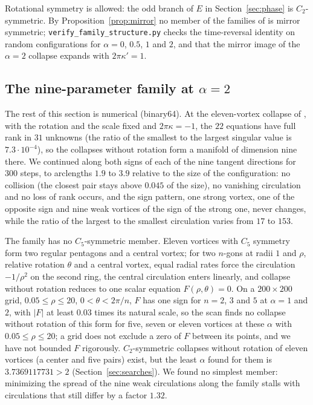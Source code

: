 \documentclass[11pt]{article}
\theoremstyle{definition}
\begin{document}
Rotational symmetry is allowed: the odd branch of $E$ in Section~\ref{sec:phase} is $C_2$-symmetric. By Proposition~\ref{prop:mirror} no member of the families of \cite[Theorem~5]{mw2026} is mirror symmetric; \texttt{verify\_\allowbreak family\_\allowbreak structure.py} checks the time-reversal identity on random configurations for $\alpha = 0$, $0.5$, $1$ and $2$, and that the mirror image of the $\alpha = 2$ collapse expands with $2\pi\kappa' = 1$.

\subsection{The nine-parameter family at \texorpdfstring{$\alpha = 2$}{alpha = 2}}\label{sec:family}

The rest of this section is numerical (binary64). At the eleven-vortex collapse of \cite[Theorem~5(a)]{mw2026}, with the rotation and the scale fixed and $2\pi\kappa = -1$, the $22$ equations have full rank in $31$ unknowns (the ratio of the smallest to the largest singular value is $7.3 \cdot 10^{-4}$), so the collapses without rotation form a manifold of dimension nine there. We continued along both signs of each of the nine tangent directions for $300$ steps, to arclengths $1.9$ to $3.9$ relative to the size of the configuration: no collision (the closest pair stays above $0.045$ of the size), no vanishing circulation and no loss of rank occurs, and the sign pattern, one strong vortex, one of the opposite sign and nine weak vortices of the sign of the strong one, never changes, while the ratio of the largest to the smallest circulation varies from $17$ to $153$.

The family has no $C_5$-symmetric member. Eleven vortices with $C_5$ symmetry form two regular pentagons and a central vortex; for two $n$-gons at radii $1$ and $\rho$, relative rotation $\theta$ and a central vortex, equal radial rates force the circulation $-1/\rho^2$ on the second ring, the central circulation enters linearly, and collapse without rotation reduces to one scalar equation $F(\rho, \theta) = 0$. On a $200 \times 200$ grid, $0.05 \le \rho \le 20$, $0 < \theta < 2\pi/n$, $F$ has one sign for $n = 2$, $3$ and $5$ at $\alpha = 1$ and $2$, with $|F|$ at least $0.03$ times its natural scale, so the scan finds no collapse without rotation of this form for five, seven or eleven vortices at these $\alpha$ with $0.05 \le \rho \le 20$; a grid does not exclude a zero of $F$ between its points, and we have not bounded $F$ rigorously. $C_2$-symmetric collapses without rotation of eleven vortices (a center and five pairs) exist, but the least $\alpha$ found for them is $3.7369117731 > 2$ (Section~\ref{sec:searches}). We found no simplest member: minimizing the spread of the nine weak circulations along the family stalls with circulations that still differ by a factor $1.32$.
\end{document}
